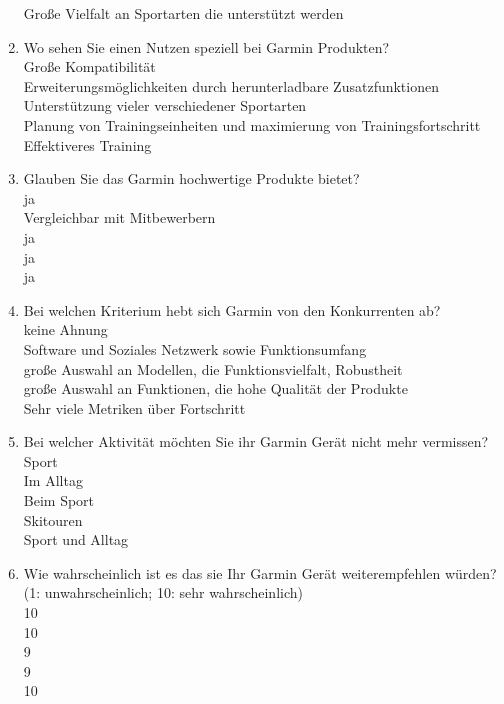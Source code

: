 \begin{enumerate}
    Große Vielfalt an Sportarten die unterstützt werden 
    \item Wo sehen Sie einen Nutzen speziell bei Garmin Produkten? \\
    Große Kompatibilität \\
    Erweiterungsmöglichkeiten durch herunterladbare Zusatzfunktionen \\
    Unterstützung vieler verschiedener Sportarten \\
    Planung von Trainingseinheiten und maximierung von Trainingsfortschritt \\
    Effektiveres Training
    \item Glauben Sie das Garmin hochwertige Produkte bietet? \\
    ja \\
    Vergleichbar mit Mitbewerbern \\
    ja \\
    ja \\
    ja
    \item Bei welchen Kriterium hebt sich Garmin von den Konkurrenten ab? \\
    keine Ahnung \\
    Software und Soziales Netzwerk sowie Funktionsumfang \\
    große Auswahl an Modellen, die Funktionsvielfalt, Robustheit \\
    große Auswahl an Funktionen, die hohe Qualität der Produkte \\
    Sehr viele Metriken über Fortschritt
    \item Bei welcher Aktivität möchten Sie ihr Garmin Gerät nicht mehr vermissen? \\
    Sport \\
    Im Alltag\\
    Beim Sport \\
    Skitouren \\
    Sport und Alltag
    \item Wie wahrscheinlich ist es das sie Ihr Garmin Gerät weiterempfehlen würden? \\
    (1: unwahrscheinlich; 10: sehr wahrscheinlich) \\
    10 \\
    10 \\
    9 \\
    9 \\
    10
\end{enumerate}
